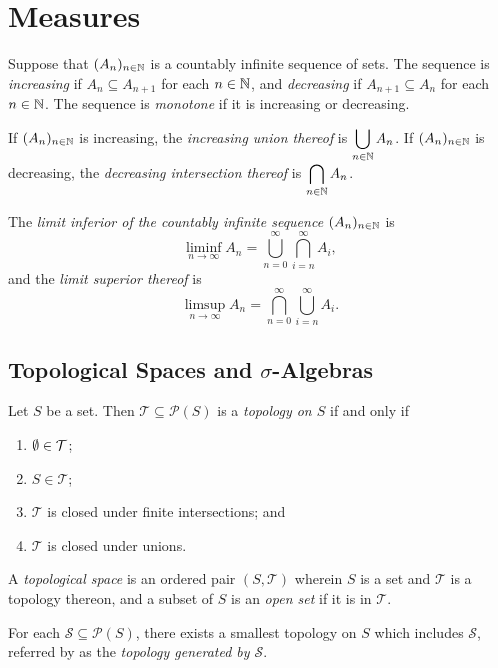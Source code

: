 



\section{Measures}

Suppose that \((A_n)_{n \in \mathbb{N}}\) is a countably infinite sequence of sets. The sequence is \emph{increasing} if
\(A_n \subseteq A_{n + 1}\) for each \(n \in \mathbb{N}\), and \emph{decreasing} if \(A_{n + 1} \subseteq A_n\) for each
\(n \in \mathbb{N}\). The sequence is \emph{monotone} if it is increasing or decreasing.

If \((A_n)_{n \in \mathbb{N}}\) is increasing, the \emph{increasing union thereof} is \(\displaystyle \bigcup_{n \in \mathbb{N}} A_n\).
If \((A_n)_{n \in \mathbb{N}}\) is decreasing, the \emph{decreasing intersection thereof} is \(\displaystyle \bigcap_{n \in \mathbb{N}}
A_n\).

The \emph{limit inferior of the countably infinite sequence \((A_n)_{n \in \mathbb{N}}\)} is
\[
  \liminf_{n \to \infty} A_n = \bigcup_{n = 0}^\infty \bigcap_{i = n}^\infty A_i,
\]
and the \emph{limit superior thereof} is
\[
  \limsup_{n \to \infty} A_n = \bigcap_{n = 0}^\infty \bigcup_{i = n}^\infty A_i.
\]

\subsection{Topological Spaces and \texorpdfstring{\(\sigma\)}{Sigma}-Algebras}

\Bdf
  Let \(S\) be a set. Then \(\mathcal{T} \subseteq \mathcal{P}(S)\) is a \emph{topology on \(S\)} if and only if
  \begin{enumerate}
    \item \(\emptyset \in \mathcal{T}\);
    \item \(S \in \mathcal{T}\);
    \item \(\mathcal{T}\) is closed under finite intersections; and
    \item \(\mathcal{T}\) is closed under unions.
  \end{enumerate}

  A \emph{topological space} is an ordered pair \((S, \mathcal{T})\) wherein \(S\) is a set and \(\mathcal{T}\) is a
  topology thereon, and a subset of \(S\) is an \emph{open set} if it is in \(\mathcal{T}\).
\Edf

For each \(\mathcal{S} \subseteq \mathcal{P}(S)\), there exists a smallest topology on \(S\) which includes
\(\mathcal{S}\), referred by as the \emph{topology generated by \(\mathcal{S}\)}.

